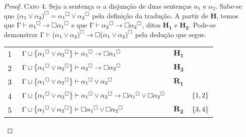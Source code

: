 \begin{tcolorbox}[enhanced jigsaw, breakable, sharp corners, colframe=black, colback=white, boxrule=0.5pt, left=1.5mm, right=1.5mm, top=1.5mm, bottom=1.5mm]
\begin{theorem}[Estabilidade]
\begin{proof}
            \vspace{.5\baselineskip}
            \textsc{Caso 4.}
            Seja a sentença $\alpha$ a disjunção de duas sentenças $\alpha_1$ e $\alpha_2$.
            Sabe-se que ${(\alpha_1\vee\alpha_2)}^\Box={\alpha_1}^\Box\vee{\alpha_2}^\Box$ pela definição da tradução.
            A partir de $\mathbf{H}$, temos que $\Gamma\mathrel{\vdash}{\alpha_1}^\Box\to\Box{\alpha_1}^\Box$ e que $\Gamma\mathrel{\vdash}{\alpha_2}^\Box\to\Box{\alpha_2}^\Box$, ditos $\mathbf{H_1}$ e $\mathbf{H_2}$.
            Pode-se demonstrar $\Gamma\vdash{(\alpha_1\vee\alpha_2)}^\Box\to\Box{(\alpha_1\vee\alpha_2)}^\Box$ pela dedução que segue.

            \vspace{.5\baselineskip}
            \footnotesize
            \setlength{\rowskip}{.5\baselineskip}
            \begin{xltabular}{\textwidth}{r | X l l}
                \scriptsize{\phantom{1}1}\phantom{ } & $\ \Gamma\cup\set{{\alpha_1}^\medsquare\vee{\alpha_2}^\medsquare}\entails{\alpha_1}^\medsquare\to\nec{\alpha_1}^\medsquare$                                                                 & $\mathbf{H_1}$                                  & \\[\rowskip]
                \scriptsize{\phantom{1}2}\phantom{ } & $\ \Gamma\cup\set{{\alpha_1}^\medsquare\vee{\alpha_2}^\medsquare}\entails{\alpha_2}^\medsquare\to\nec{\alpha_2}^\medsquare$                                                                 & $\mathbf{H_2}$                                  & \\[\rowskip]\pagebreak[4]
                \scriptsize{\phantom{1}3}\phantom{ } & $\ \Gamma\cup\set{{\alpha_1}^\medsquare\vee{\alpha_2}^\medsquare}\entails{\alpha_1}^\medsquare\vee{\alpha_2}^\medsquare$                                                                    & $\hyperref[modal.rule.1]{\mathbf{R_1}}$         & \\[\rowskip]
                \scriptsize{\phantom{1}4}\phantom{ } & $\ \Gamma\cup\set{{\alpha_1}^\medsquare\vee{\alpha_2}^\medsquare}\entails{\alpha_1}^\medsquare\vee{\alpha_2}^\medsquare\to\nec{\alpha_1}^\medsquare\vee\nec{\alpha_2}^\medsquare$           &                  & $\left\{1, 2\right\}$\\[\rowskip]
                \scriptsize{\phantom{1}5}\phantom{ } & $\ \Gamma\cup\set{{\alpha_1}^\medsquare\vee{\alpha_2}^\medsquare}\entails\nec{\alpha_1}^\medsquare\vee\nec{\alpha_2}^\medsquare$                                                            & $\hyperref[modal.rule.2]{\mathbf{R_2}}$         & $\left\{3,4\right\}$\\[\rowskip]

\end{xltabular}
\end{proof}
\end{theorem}
\end{tcolorbox}
